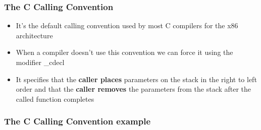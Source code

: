\documentclass[]{beamer}
\begin{document}
\begin{frame}
  \frametitle{The C Calling Convention}
  \begin{itemize}
  \item{It's the default calling convention used by most C compilers for the x86 architecture}
  \item{When a compiler doesn't use this convention we can force it using the modifier \color{red}\_cdecl}
  \item{It specifies that the \textbf{caller places} parameters on the stack in the right to left order and that the \textbf{caller removes} the parameters from the stack after the called function completes}
  \end{itemize}
\end{frame}
\begin{frame}
  \frametitle{The C Calling Convention example}
  \begin{figure}
    \\
    \begin{columns}
      \begin{column}{2.5in}
        \\
      \end{column}
    \end{columns}
  \end{figure}
\end{frame}
\end{document}
